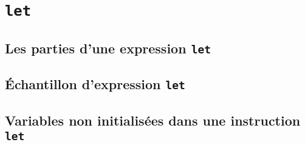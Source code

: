 \section{\texttt{let}}

\subsection{Les parties d'une expression \texttt{let}}

\subsection{\'Echantillon d'expression \texttt{let}}

\subsection{Variables non initialisées dans une instruction
  \texttt{let}} 